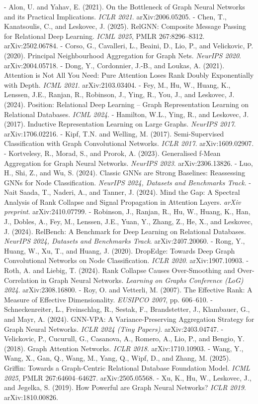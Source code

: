 \documentclass[final]{article}
\begin{document}
- Alon, U. and Yahav, E. (2021). On the Bottleneck of Graph Neural Networks and its Practical Implications. \textit{ICLR 2021}. arXiv:2006.05205.
- Chen, T., Kanatsoulis, C., and Leskovec, J. (2025). RelGNN: Composite Message Passing for Relational Deep Learning. \textit{ICML 2025}, PMLR 267:8296--8312. arXiv:2502.06784.
- Corso, G., Cavalleri, L., Beaini, D., Lio, P., and Velickovic, P. (2020). Principal Neighbourhood Aggregation for Graph Nets. \textit{NeurIPS 2020}. arXiv:2004.05718.
- Dong, Y., Cordonnier, J.-B., and Loukas, A. (2021). Attention is Not All You Need: Pure Attention Loses Rank Doubly Exponentially with Depth. \textit{ICML 2021}. arXiv:2103.03404.
- Fey, M., Hu, W., Huang, K., Lenssen, J.E., Ranjan, R., Robinson, J., Ying, R., You, J., and Leskovec, J. (2024). Position: Relational Deep Learning -- Graph Representation Learning on Relational Databases. \textit{ICML 2024}.
- Hamilton, W.L., Ying, R., and Leskovec, J. (2017). Inductive Representation Learning on Large Graphs. \textit{NeurIPS 2017}. arXiv:1706.02216.
- Kipf, T.N. and Welling, M. (2017). Semi-Supervised Classification with Graph Convolutional Networks. \textit{ICLR 2017}. arXiv:1609.02907.
- Kortvelesy, R., Morad, S., and Prorok, A. (2023). Generalised f-Mean Aggregation for Graph Neural Networks. \textit{NeurIPS 2023}. arXiv:2306.13826.
- Luo, H., Shi, Z., and Wu, S. (2024). Classic GNNs are Strong Baselines: Reassessing GNNs for Node Classification. \textit{NeurIPS 2024, Datasets and Benchmarks Track}.
- Nait Saada, T., Naderi, A., and Tanner, J. (2024). Mind the Gap: A Spectral Analysis of Rank Collapse and Signal Propagation in Attention Layers. \textit{arXiv preprint}. arXiv:2410.07799.
- Robinson, J., Ranjan, R., Hu, W., Huang, K., Han, J., Dobles, A., Fey, M., Lenssen, J.E., Yuan, Y., Zhang, Z., He, X., and Leskovec, J. (2024). RelBench: A Benchmark for Deep Learning on Relational Databases. \textit{NeurIPS 2024, Datasets and Benchmarks Track}. arXiv:2407.20060.
- Rong, Y., Huang, W., Xu, T., and Huang, J. (2020). DropEdge: Towards Deep Graph Convolutional Networks on Node Classification. \textit{ICLR 2020}. arXiv:1907.10903.
- Roth, A. and Liebig, T. (2024). Rank Collapse Causes Over-Smoothing and Over-Correlation in Graph Neural Networks. \textit{Learning on Graphs Conference (LoG) 2024}. arXiv:2308.16800.
- Roy, O. and Vetterli, M. (2007). The Effective Rank: A Measure of Effective Dimensionality. \textit{EUSIPCO 2007}, pp. 606--610.
- Schneckenreiter, L., Freinschlag, R., Sestak, F., Brandstetter, J., Klambauer, G., and Mayr, A. (2024). GNN-VPA: A Variance-Preserving Aggregation Strategy for Graph Neural Networks. \textit{ICLR 2024 (Tiny Papers)}. arXiv:2403.04747.
- Velickovic, P., Cucurull, G., Casanova, A., Romero, A., Lio, P., and Bengio, Y. (2018). Graph Attention Networks. \textit{ICLR 2018}. arXiv:1710.10903.
- Wang, Y., Wang, X., Gan, Q., Wang, M., Yang, Q., Wipf, D., and Zhang, M. (2025). Griffin: Towards a Graph-Centric Relational Database Foundation Model. \textit{ICML 2025}, PMLR 267:64604--64627. arXiv:2505.05568.
- Xu, K., Hu, W., Leskovec, J., and Jegelka, S. (2019). How Powerful are Graph Neural Networks? \textit{ICLR 2019}. arXiv:1810.00826.
\end{document}
